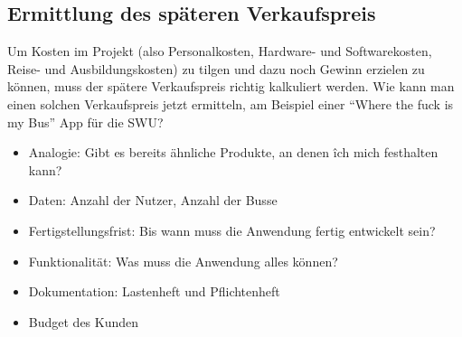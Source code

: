 \documentclass[a4paper,12pt]{article}
\begin{document}
	\subsection*{Ermittlung des späteren Verkaufspreis}
	Um Kosten im Projekt (also Personalkosten, Hardware- und Softwarekosten, Reise- und Ausbildungskosten) zu tilgen und dazu noch Gewinn erzielen zu können, muss der spätere Verkaufspreis richtig kalkuliert werden. Wie kann man einen solchen Verkaufspreis jetzt ermitteln, am Beispiel einer "`Where the fuck is my Bus"' App für die SWU?
	\begin{itemize}
		\item Analogie: Gibt es bereits ähnliche Produkte, an denen îch mich festhalten kann?
		\item Daten: Anzahl der Nutzer, Anzahl der Busse
		\item Fertigstellungsfrist: Bis wann muss die Anwendung fertig entwickelt sein?
		\item Funktionalität: Was muss die Anwendung alles können?
		\item Dokumentation: Lastenheft und Pflichtenheft
		\item Budget des Kunden
	\end{itemize}
\end{document}
